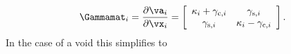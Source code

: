 \begin{equation}
  \Gammamat_i = \frac{\partial\va_i}{\partial\vx_i}
  = \left[\begin{array}{cc}
    \kappa_i + \gamma_{\mathrm{c},i} & \gamma_{\mathrm{s},i} \\
    \gamma_{\mathrm{s},i} & \kappa_i - \gamma_{\mathrm{c},i}
  \end{array}\right].
\end{equation}
In the case of a void this simplifies to